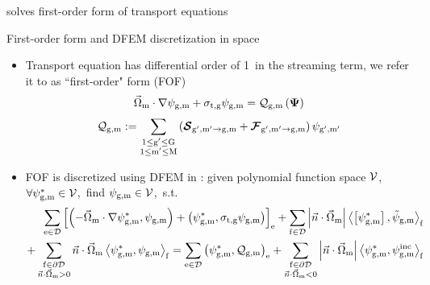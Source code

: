 \begin{frame}{ solves first-order form of transport equations}
	\begin{block}{First-order form and DFEM discretization in space}
		\begin{itemize}
			\item Transport equation has differential order of 1\ in the streaming term, we refer it to as ``first-order" form (FOF) 
			\begin{align}
				\ome_\mm{m}\cdot\nabla\psigm+\sigma_{\mm{t,g}}\psigm=\mathcal{Q}_\mm{g,m}\left({\bf \Psi}\right)
			\end{align}
			\begin{align}
			   \mq_\mm{g,m}:=\sum\limits_{\substack{1\leq\mm{g'}\leq\mm{G}\\1\leq\mm{m'}\leq\mm{M}}}\left(\bfscr{S}_{\mm{g',m'}\to\mm{g,m}}+\bfscr{F}_{\mm{g',m'}\to\mm{g,m}}\right)\psigmp
			\end{align}
			\item FOF is discretized using DFEM in : given polynomial function space $\mv$,\ $\forall\psigm^*\in\mv$,\ find $\psigm\in\mv$,\ s.t.
			\begin{align}
			\sum\limits_{\mm{e}\in\md}\left[\left(-\omemn\psigms,\psigm\right)+\left(\psigms,\sigtg\psigm\right)\right]_\mm{e}+\sum\limits_{\mm{f}\in\md}\left|\ndom\right|\left<\jjump{\psigms},\tilde{\psi}_\mm{g,m}\right>_\mm{f}\nno\\
			+\sum\limits_{\substack{\mm{f}\in\pd\\\ndom>0}}\ndom\left<\psigms,\psigm\right>_\mm{f}=\sum\limits_{\mm{e}\in\md}\left(\psigms,\mqgm\right)_\mm{e}+\sum\limits_{\substack{\mm{f}\in\pd\\\ndom<0}}\absndom\left<\psigms,\psigm^\mm{inc}\right>_\mm{f}
			\end{align}
		\end{itemize}
	\end{block}
\end{frame}

